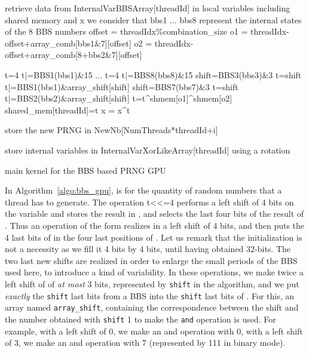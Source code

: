 \documentclass{article}
\begin{document}
\begin{algorithm}


 {
  retrieve data from InternalVarBBSArray[threadId] in local variables including shared memory and x\;
  we consider that bbs1 ... bbs8 represent the internal states of the 8 BBS numbers\;
  offset = threadIdx\%combination\_size\;
  o1 = threadIdx-offset+array\_comb[bbs1\&7][offset]\;
  o2 = threadIdx-offset+array\_comb[8+bbs2\&7][offset]\;
   {
    t=4\;
    t|=BBS1(bbs1)\&15\;
    ...\;
    t=4\;
    t|=BBS8(bbs8)\&15\;
    shift=BBS3(bbs3)\&3\;
    t=shift\;
    t|=BBS1(bbs1)\&array\_shift[shift]\;
    shift=BBS7(bbs7)\&3\;
    t=shift\;
    t|=BBS2(bbs2)\&array\_shift[shift]\;
    t=t\textasciicircum  shmem[o1]\textasciicircum     shmem[o2]\;
    shared\_mem[threadId]=t\;
    x = x\textasciicircum   t\;

    store the new PRNG in NewNb[NumThreads*threadId+i]\;
  }
  store internal variables in InternalVarXorLikeArray[threadId] using a rotation\;
}

\caption{main kernel for the BBS based PRNG GPU}
\label{algo:bbs_gpu}
\end{algorithm}

In Algorithm~\ref{algo:bbs_gpu},  is for  the quantity of random numbers that
a thread has to  generate.  The operation t<<=4 performs a left  shift of 4 bits
on the variable   and stores the result in  , and  selects
the last  four bits  of the  result of .   Thus an  operation of  the form
  realizes in  a  left shift of 4  bits, and then
puts the 4 last bits of   in the four last positions of .  Let us
remark that the initialization  is not a  necessity as we fill it 4 bits by 4
bits, until  having obtained 32-bits.  The  two last new shifts  are realized in
order to enlarge the small periods of  the BBS used here, to introduce a kind of
variability.  In these operations, we make twice a left shift of  of \emph{at
  most}  3 bits,  represented by  \texttt{shift} in  the algorithm,  and  we put
\emph{exactly} the \texttt{shift}  last bits from a BBS  into the \texttt{shift}
last bits of . For this, an array named \texttt{array\_shift}, containing the
correspondence between the  shift and the number obtained  with \texttt{shift} 1
to make the \texttt{and} operation is used. For example, with a left shift of 0,
we  make an  and operation  with 0,  with  a left  shift of  3, we  make an  and
operation with 7 (represented by 111 in binary mode).
\end{document}
